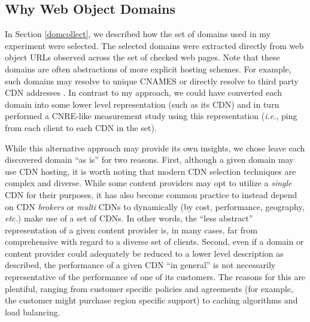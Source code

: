 \subsection{Why Web Object Domains}

In Section \ref{domcollect}, we described how the set of domains used in my
experiment were selected. The selected domains were extracted directly
from web object URLs observed across the set of checked web pages. Note
that these domains are often abstractions of more explicit hosting schemes.
For example, such domains may resolve to unique CNAMES or directly resolve
to third party CDN addresses \cite{Su2006}. In contrast to my approach, we could have
converted each domain into some lower level representation (such as its CDN) and
in turn performed a CNRE-like measurement study using this representation
(\emph{i.e.}, ping from each client to each CDN in the set).

While this alternative approach may provide its own insights, we chose leave
each discovered domain ``as is'' for two reasons. First, although a given domain
may use CDN hosting, it is worth noting that modern CDN selection techniques are
complex and diverse. While some content providers may opt to utilize a
\emph{single} CDN for their purposes, it has also become common practice to
instead depend on CDN \emph{brokers} or \emph{multi} CDNs to dynamically (by
cost, performance, geography, \emph{etc.}) make use of a set of CDNs. In other
words, the ``less abstract'' representation of a given content provider is, in
many cases, far from comprehensive with regard to a diverse set of clients.
Second, even if a domain or content provider could adequately be reduced to a
lower level description as described, the performance of a given CDN ``in
general'' is not necessarily representative of the performance of one of its
customers. The reasons for this are plentiful, ranging from customer specific
policies and agreements (for example, the customer might purchase region
specific support) to caching algorithms and load balancing. 
